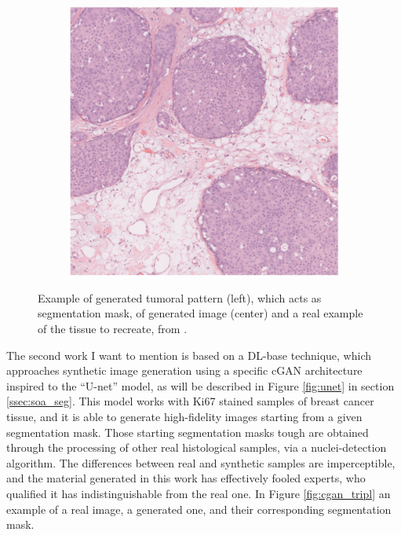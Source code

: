 \begin{figure}[ht]
\begin{subfigure}[t]{0.3\textwidth}
             \caption{}
             \label{fig:morpho_model}
        \end{subfigure}
        \quad
        \begin{subfigure}[t]{0.3\textwidth}
             \centering
             \includegraphics[width = \textwidth]{images/morpho_real}
             \caption{}
             \label{fig:morpho_real}
        \end{subfigure}
        \caption{Example of generated tumoral pattern (left), which acts as segmentation mask, of generated image (center) and a real example of the tissue to recreate, from \cite{10.1117/12.2254452}.}
        \label{fig:morpho_tripl}
    \end{figure}

The second work I want to mention is based on a DL-base technique, which approaches synthetic image generation using a specific cGAN architecture inspired to the ``U-net'' \cite{Senaras2018} model, as will be described in Figure \ref{fig:unet} in section \ref{ssec:soa_seg}. This model works with Ki67 stained samples of breast cancer tissue, and it is able to generate high-fidelity images starting from a given segmentation mask. Those starting segmentation masks tough are obtained through the processing of other real histological samples, via a nuclei-detection algorithm. The differences between real and synthetic samples are imperceptible, and the material generated in this work has effectively fooled experts, who qualified it has indistinguishable from the real one. In Figure \ref{fig:cgan_tripl} an example of a real image, a generated one, and their corresponding segmentation mask.

